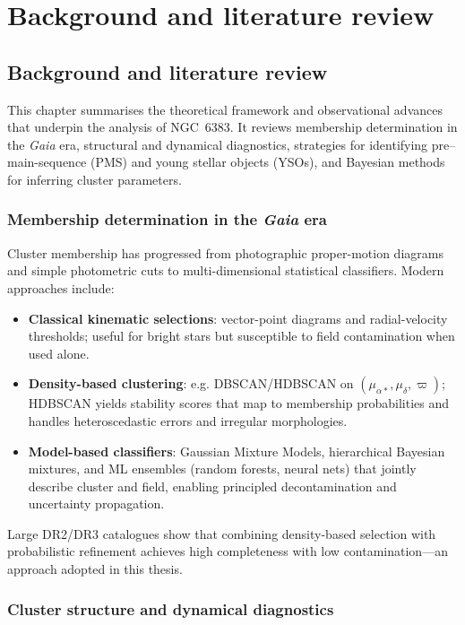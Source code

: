 \documentclass[../main.tex]{subfiles}
\begin{document}
\section{Background and literature review}
\label{chap:background}

\subsection{Background and literature review}
\label{subsec:background}

This chapter summarises the theoretical framework and observational advances that underpin the analysis of NGC~6383. It reviews membership determination in the \texorpdfstring{\textit{Gaia}}{Gaia} era, structural and dynamical diagnostics, strategies for identifying pre–main-sequence (PMS) and young stellar objects (YSOs), and Bayesian methods for inferring cluster parameters.

\subsubsection{Membership determination in the \texorpdfstring{\textit{Gaia}}{Gaia} era}
\label{subsubsec:membership-gaia}

Cluster membership has progressed from photographic proper-motion diagrams and simple photometric cuts to multi-dimensional statistical classifiers. Modern approaches include:
\begin{itemize}
  \item \textbf{Classical kinematic selections}: vector-point diagrams and radial-velocity thresholds; useful for bright stars but susceptible to field contamination when used alone.
  \item \textbf{Density-based clustering}: e.g. DBSCAN/HDBSCAN on $(\mu_{\alpha*},\mu_\delta,\varpi)$; HDBSCAN yields stability scores that map to membership probabilities and handles heteroscedastic errors and irregular morphologies.
  \item \textbf{Model-based classifiers}: Gaussian Mixture Models, hierarchical Bayesian mixtures, and ML ensembles (random forests, neural nets) that jointly describe cluster and field, enabling principled decontamination and uncertainty propagation.
\end{itemize}
Large DR2/DR3 catalogues show that combining density-based selection with probabilistic refinement achieves high completeness with low contamination—an approach adopted in this thesis.

\subsubsection{Cluster structure and dynamical diagnostics}
\label{subsubsec:structure-dynamics}
\end{document}
